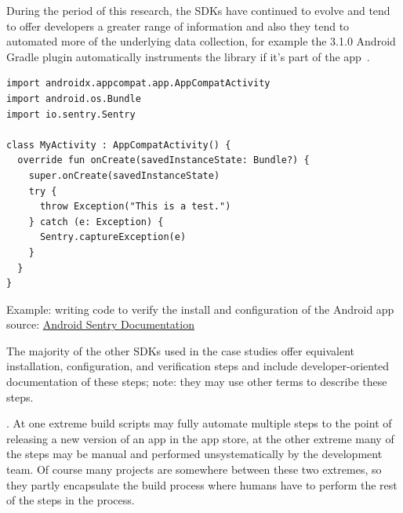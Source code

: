 During the period of this research, the SDKs have continued to evolve and tend to offer developers a greater range of information and also they tend to automated more of the underlying data collection, for example the  3.1.0 Android Gradle plugin automatically instruments the  library if it's part of the app~.


\begin{listing}
\begin{verbatim}
import androidx.appcompat.app.AppCompatActivity
import android.os.Bundle
import io.sentry.Sentry

class MyActivity : AppCompatActivity() {
  override fun onCreate(savedInstanceState: Bundle?) {
    super.onCreate(savedInstanceState)
    try {
      throw Exception("This is a test.")
    } catch (e: Exception) {
      Sentry.captureException(e)
    }
  }
}
\end{verbatim}
\caption{Example: writing code to verify the install and configuration of the Android app\\ source: \href{https://docs.sentry.io/platforms/android/}{Android Sentry Documentation}}
\label{listing:android_activity_to_verify_sentry_works_in_app}
\end{listing}

The majority of the other SDKs used in the case studies offer equivalent installation, configuration, and verification steps and include developer-oriented documentation of these steps; note: they may use other terms to describe these steps.

.  
At one extreme build scripts may fully automate multiple steps to the point of releasing a new version of an app in the app store, at the other extreme many of the steps may be manual and performed unsystematically by the development team. Of course many projects are somewhere between these two extremes, so they partly encapsulate the build process where humans have to perform the rest of the steps in the process. 

